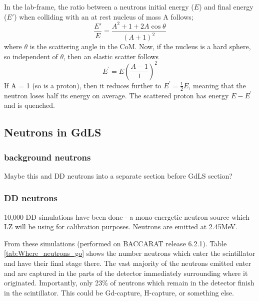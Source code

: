 \par
In the lab-frame, the ratio between a neutrons initial energy ($E$) and final energy ($E'$) when colliding with an at rest nucleus of mass A follows;
\begin{equation}
    \frac{E'}{E} = \frac{A^2 + 1 + 2A\cos{\theta}}{(A + 1)^2}
\end{equation}
where $\theta$ is the scattering angle in the CoM.
Now, if the nucleus is a hard sphere, so independent of $\theta$, then an elastic scatter follows
\begin{equation}
    E^{'} = E(\frac{A-1}{1})^{2}
\end{equation}
If A = 1 (so is a proton), then it reduces further to $E^{'} = \frac{1}{2}E$, meaning that the neutron loses half its energy on average.
The scattered proton has energy $E - E^{'}$ and is quenched.



\subsection{Neutrons in GdLS}

\subsubsection{background neutrons}
\par
Maybe this and DD neutrons into a separate section before GdLS section?

\subsubsection{DD neutrons}
\par
10,000 DD simulations have been done - a mono-energetic neutron source which LZ will be using for calibration purposes.
Neutrons are emitted at 2.45MeV.

\par
From these simulations (performed on BACCARAT release 6.2.1).
Table \ref{tab:Where_neutrons_go} shows the number neutrons which enter the scintillator and have their final stage there.
The vast majority of the neutrons emitted enter and are captured in the parts of the detector immediately surrounding where it originated.
Importantly, only 23\% of neutrons which remain in the detector finish in the scintillator.
This could be Gd-capture, H-capture, or something else.

